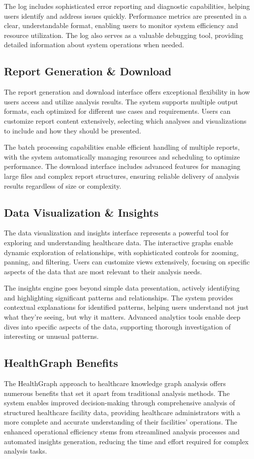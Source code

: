 \documentclass[12pt,a4paper]{report}
\begin{document}
The log includes sophisticated error reporting and diagnostic capabilities, helping users identify and address issues quickly. Performance metrics are presented in a clear, understandable format, enabling users to monitor system efficiency and resource utilization. The log also serves as a valuable debugging tool, providing detailed information about system operations when needed.

\subsection{Report Generation \& Download}
The report generation and download interface offers exceptional flexibility in how users access and utilize analysis results. The system supports multiple output formats, each optimized for different use cases and requirements. Users can customize report content extensively, selecting which analyses and visualizations to include and how they should be presented.

The batch processing capabilities enable efficient handling of multiple reports, with the system automatically managing resources and scheduling to optimize performance. The download interface includes advanced features for managing large files and complex report structures, ensuring reliable delivery of analysis results regardless of size or complexity.

\subsection{Data Visualization \& Insights}
The data visualization and insights interface represents a powerful tool for exploring and understanding healthcare data. The interactive graphs enable dynamic exploration of relationships, with sophisticated controls for zooming, panning, and filtering. Users can customize views extensively, focusing on specific aspects of the data that are most relevant to their analysis needs.

The insights engine goes beyond simple data presentation, actively identifying and highlighting significant patterns and relationships. The system provides contextual explanations for identified patterns, helping users understand not just what they're seeing, but why it matters. Advanced analytics tools enable deep dives into specific aspects of the data, supporting thorough investigation of interesting or unusual patterns.

\subsection{HealthGraph Benefits}
The HealthGraph approach to healthcare knowledge graph analysis offers numerous benefits that set it apart from traditional analysis methods. The system enables improved decision-making through comprehensive analysis of structured healthcare facility data, providing healthcare administrators with a more complete and accurate understanding of their facilities' operations. The enhanced operational efficiency stems from streamlined analysis processes and automated insights generation, reducing the time and effort required for complex analysis tasks.
\end{document}
